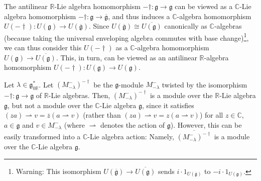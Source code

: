 \documentclass
[numbers=enddot,12pt,final,onecolumn,german,notitlepage]{scrartcl}%
\theoremstyle{definition}
\begin{document}
The antilinear $\mathbb{R}$-Lie algebra homomorphism $-\dag:\mathfrak{g}%
\rightarrow\mathfrak{g}$ can be viewed as a $\mathbb{C}$-Lie algebra
homomorphism $-\dag:\mathfrak{g}\rightarrow\overline{\mathfrak{g}}$, and thus
induces a $\mathbb{C}$-algebra homomorphism $U\left(  -\dag\right)  :U\left(
\mathfrak{g}\right)  \rightarrow U\left(  \overline{\mathfrak{g}}\right)  $.
Since $U\left(  \overline{\mathfrak{g}}\right)  \cong\overline{U\left(
\mathfrak{g}\right)  }$ canonically as $\mathbb{C}$-algebras (because taking
the universal enveloping algebra commutes with base change)\footnote{Warning:
This isomorphism $U\left(  \overline{\mathfrak{g}}\right)  \rightarrow
\overline{U\left(  \mathfrak{g}\right)  }$ sends $i\cdot1_{U\left(
\overline{\mathfrak{g}}\right)  }$ to $-i\cdot1_{U\left(  \mathfrak{g}\right)
}$.}, we can thus consider this $U\left(  -\dag\right)  $ as a $\mathbb{C}%
$-algebra homomorphism $U\left(  \mathfrak{g}\right)  \rightarrow
\overline{U\left(  \mathfrak{g}\right)  }$. This, in turn, can be viewed as an
antilinear $\mathbb{R}$-algebra homomorphism $U\left(  -\dag\right)  :U\left(
\mathfrak{g}\right)  \rightarrow U\left(  \mathfrak{g}\right)  $.

Let $\lambda\in\mathfrak{g}_{0\mathbb{R}}^{\ast}$. Let $\left(  M_{-\lambda
}^{-}\right)  ^{-\dag}$ be the $\mathfrak{g}$-module $M_{-\lambda}^{-}$
twisted by the isomorphism $-\dag:\mathfrak{g}\rightarrow\mathfrak{g}$ of
$\mathbb{R}$-Lie algebras. Then, $\left(  M_{-\lambda}^{-}\right)  ^{-\dag}$
is a module over the $\mathbb{R}$-Lie algebra $\mathfrak{g}$, but not a module
over the $\mathbb{C}$-Lie algebra $\mathfrak{g}$, since it satisfies $\left(
za\right)  \rightharpoonup v=\overline{z}\left(  a\rightharpoonup v\right)  $
(rather than $\left(  za\right)  \rightharpoonup v=z\left(  a\rightharpoonup
v\right)  $) for all $z\in\mathbb{C}$, $a\in\mathfrak{g}$ and $v\in
M_{-\lambda}^{-}$ (where $\rightharpoonup$ denotes the action of
$\mathfrak{g}$). However, this can be easily transformed into a $\mathbb{C}%
$-Lie algebra action: Namely, $\overline{\left(  M_{-\lambda}^{-}\right)
^{-\dag}}$ is a module over the $\mathbb{C}$-Lie algebra $\mathfrak{g}$.
\end{document}
